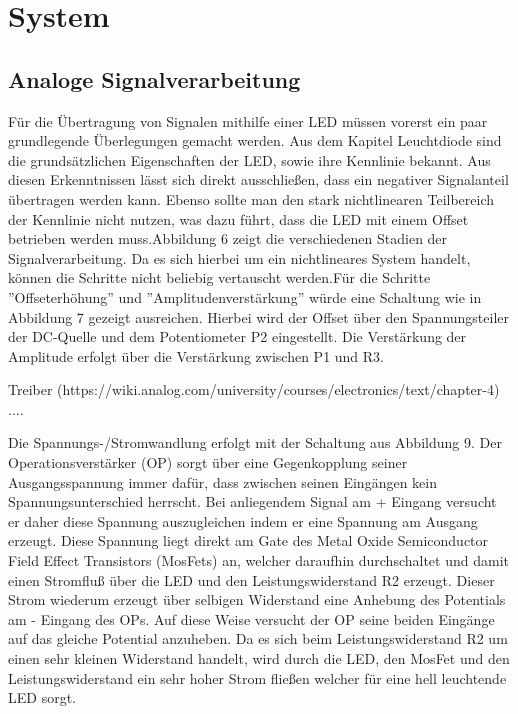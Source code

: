 
\chapter{System}
\label{sec:system}

\section{Analoge Signalverarbeitung}
\label{sec:Signalverarbeitung}
Für die Übertragung von Signalen mithilfe einer LED müssen vorerst ein paar
grundlegende Überlegungen gemacht werden. Aus dem Kapitel Leuchtdiode sind
die grundsätzlichen Eigenschaften der LED, sowie ihre Kennlinie bekannt. Aus
diesen Erkenntnissen lässt sich direkt ausschließen, dass ein negativer Signalanteil
übertragen werden kann. Ebenso sollte man den stark nichtlinearen Teilbereich der
Kennlinie nicht nutzen, was dazu führt, dass die LED mit einem Offset betrieben
werden muss.Abbildung 6 zeigt die verschiedenen Stadien der Signalverarbeitung. Da es sich
hierbei um ein nichtlineares System handelt, können die Schritte nicht beliebig
vertauscht werden.Für die Schritte ”Offseterhöhung” und ”Amplitudenverstärkung” würde eine Schaltung
wie in Abbildung 7 gezeigt ausreichen. Hierbei wird der Offset über den Spannungsteiler
der DC-Quelle und dem Potentiometer P2 eingestellt. Die Verstärkung
der Amplitude erfolgt über die Verstärkung zwischen P1 und R3.




Treiber (https://wiki.analog.com/university/courses/electronics/text/chapter-4) ....

Die Spannungs-/Stromwandlung erfolgt mit der Schaltung aus Abbildung 9. Der
Operationsverstärker (OP) sorgt über eine Gegenkopplung seiner Ausgangsspannung immer dafür, dass zwischen seinen Eingängen kein Spannungsunterschied
herrscht. Bei anliegendem Signal am + Eingang versucht er daher diese Spannung
auszugleichen indem er eine Spannung am Ausgang erzeugt. Diese Spannung liegt
direkt am Gate des Metal Oxide Semiconductor Field Effect Transistors (MosFets)
an, welcher daraufhin durchschaltet und damit einen Stromfluß über die LED und
den Leistungswiderstand R2 erzeugt. Dieser Strom wiederum erzeugt über selbigen
Widerstand eine Anhebung des Potentials am - Eingang des OPs. Auf diese Weise
versucht der OP seine beiden Eingänge auf das gleiche Potential anzuheben. Da es
sich beim Leistungswiderstand R2 um einen sehr kleinen Widerstand handelt, wird
durch die LED, den MosFet und den Leistungswiderstand ein sehr hoher Strom
fließen welcher für eine hell leuchtende LED sorgt.

